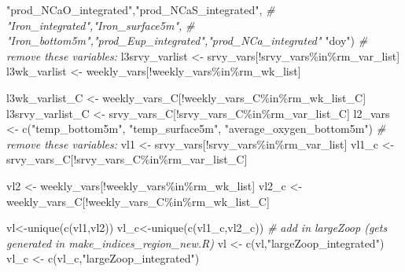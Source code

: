 \documentclass[
]{article}
\newenvironment{Shaded}{\begin{snugshade}}{\end{snugshade}}
\newcommand{\CommentTok}[1]{\textcolor[rgb]{0.56,0.35,0.01}{\textit{#1}}}
\newcommand{\FunctionTok}[1]{\textcolor[rgb]{0.00,0.00,0.00}{#1}}
\newcommand{\NormalTok}[1]{#1}
\newcommand{\OtherTok}[1]{\textcolor[rgb]{0.56,0.35,0.01}{#1}}
\newcommand{\SpecialCharTok}[1]{\textcolor[rgb]{0.00,0.00,0.00}{#1}}
\newcommand{\StringTok}[1]{\textcolor[rgb]{0.31,0.60,0.02}{#1}}
\begin{document}
\begin{Shaded}
\begin{Highlighting}[]
    \StringTok{"prod\_NCaO\_integrated"}\NormalTok{,}\StringTok{"prod\_NCaS\_integrated"}\NormalTok{,}
    \CommentTok{\# "Iron\_integrated","Iron\_surface5m",}
    \CommentTok{\# "Iron\_bottom5m","prod\_Eup\_integrated","prod\_NCa\_integrated"}
    \StringTok{"doy"}\NormalTok{)}
    \CommentTok{\# remove these variables:}
\NormalTok{    l3srvy\_varlist }\OtherTok{\textless{}{-}}\NormalTok{ srvy\_vars[}\SpecialCharTok{!}\NormalTok{srvy\_vars}\SpecialCharTok{\%in\%}\NormalTok{rm\_var\_list]}
\NormalTok{    l3wk\_varlist   }\OtherTok{\textless{}{-}}\NormalTok{ weekly\_vars[}\SpecialCharTok{!}\NormalTok{weekly\_vars}\SpecialCharTok{\%in\%}\NormalTok{rm\_wk\_list]}
    
\NormalTok{    l3wk\_varlist\_C   }\OtherTok{\textless{}{-}}\NormalTok{ weekly\_vars\_C[}\SpecialCharTok{!}\NormalTok{weekly\_vars\_C}\SpecialCharTok{\%in\%}\NormalTok{rm\_wk\_list\_C]}
\NormalTok{    l3srvy\_varlist\_C }\OtherTok{\textless{}{-}}\NormalTok{ srvy\_vars\_C[}\SpecialCharTok{!}\NormalTok{srvy\_vars\_C}\SpecialCharTok{\%in\%}\NormalTok{rm\_var\_list\_C]}
\NormalTok{    l2\_vars        }\OtherTok{\textless{}{-}} \FunctionTok{c}\NormalTok{(}\StringTok{"temp\_bottom5m"}\NormalTok{, }\StringTok{"temp\_surface5m"}\NormalTok{, }\StringTok{"average\_oxygen\_bottom5m"}\NormalTok{)}
    \CommentTok{\# remove these variables:}
\NormalTok{    vl1   }\OtherTok{\textless{}{-}}\NormalTok{ srvy\_vars[}\SpecialCharTok{!}\NormalTok{srvy\_vars}\SpecialCharTok{\%in\%}\NormalTok{rm\_var\_list]}
\NormalTok{    vl1\_c }\OtherTok{\textless{}{-}}\NormalTok{ srvy\_vars\_C[}\SpecialCharTok{!}\NormalTok{srvy\_vars\_C}\SpecialCharTok{\%in\%}\NormalTok{rm\_var\_list\_C]}
    
\NormalTok{    vl2   }\OtherTok{\textless{}{-}}\NormalTok{ weekly\_vars[}\SpecialCharTok{!}\NormalTok{weekly\_vars}\SpecialCharTok{\%in\%}\NormalTok{rm\_wk\_list]}
\NormalTok{    vl2\_c }\OtherTok{\textless{}{-}}\NormalTok{ weekly\_vars\_C[}\SpecialCharTok{!}\NormalTok{weekly\_vars\_C}\SpecialCharTok{\%in\%}\NormalTok{rm\_wk\_list\_C]}

\NormalTok{    vl}\OtherTok{\textless{}{-}}\FunctionTok{unique}\NormalTok{(}\FunctionTok{c}\NormalTok{(vl1,vl2))}
\NormalTok{    vl\_c}\OtherTok{\textless{}{-}}\FunctionTok{unique}\NormalTok{(}\FunctionTok{c}\NormalTok{(vl1\_c,vl2\_c))}
    \CommentTok{\# add in largeZoop (gets generated in make\_indices\_region\_new.R)}
\NormalTok{    vl }\OtherTok{\textless{}{-}} \FunctionTok{c}\NormalTok{(vl,}\StringTok{"largeZoop\_integrated"}\NormalTok{)}
\NormalTok{    vl\_c }\OtherTok{\textless{}{-}} \FunctionTok{c}\NormalTok{(vl\_c,}\StringTok{"largeZoop\_integrated"}\NormalTok{)}


\end{Highlighting}
\end{Shaded}
\end{document}
